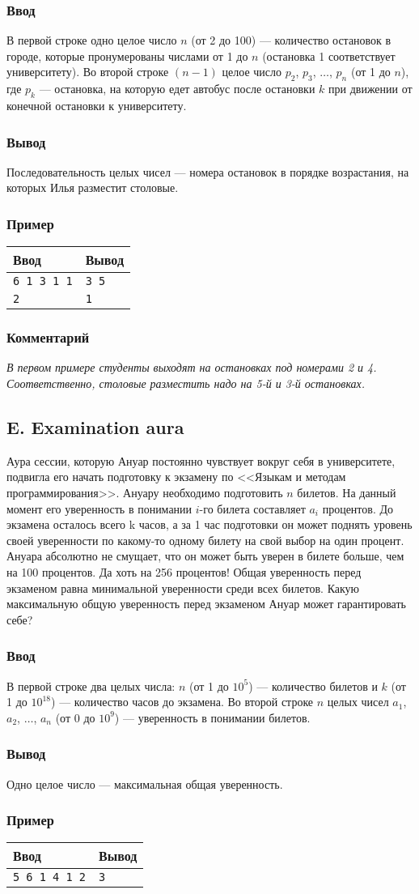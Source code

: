 \documentclass[10pt, a4paper]{article}
\newcommand{\informat}[1]
{
	\subsubsection*{Ввод} #1
}
\newcommand{\outformat}[1]
{
	\subsubsection*{Вывод} #1
}
\newcommand{\example}[2]
{
	\subsubsection*{Пример}
	\noindent
	\begin{center}
	\begin{tabularx}{\linewidth}{|X|X|}
	\hline
	Ввод & Вывод \\
	\hline
	{\tt #1} & {\tt #2}		\\
	\hline
	\end{tabularx}
	\end{center}
}
\newcommand{\examplee}[4]
{
	\subsubsection*{Пример}
	\noindent
	\begin{center}
	\begin{tabularx}{\linewidth}{|X|X|}
	\hline
	Ввод 	& Вывод  	\\
	\hline
	{\tt #1} & {\tt #2}	\\
	\hline
	{\tt #3} & {\tt #4}	\\
	\hline
	\end{tabularx}
	\end{center}
}
\newcommand{\excomm}[1]
{
	\subsubsection*{Комментарий}
	\textit{#1}
}
\begin{document}
\informat{В первой строке одно целое число $n$ (от 2 до 100) --- количество остановок в городе, которые пронумерованы числами от 1 до $n$ (остановка 1 соответствует университету). Во второй строке $(n-1)$ целое число $p_2$, $p_3$, $\dots$, $p_n$ (от 1 до $n$), где $p_k$ --- остановка, на которую едет автобус после остановки $k$ при движении от конечной остановки к университету.}
 
\outformat{Последовательность целых чисел --- номера остановок в порядке возрастания, на которых Илья разместит столовые.}

\examplee{6 \newline 5 1 3 1 1}{3 5}{2 \newline 1}{1}

\excomm{В первом примере студенты выходят на остановках под номерами 2 и 4. Соответственно, столовые разместить надо на 5-й и 3-й остановках.}



\subsection*{E. Examination aura}

Аура сессии, которую Ануар постоянно чувствует вокруг себя в университете, подвигла его начать подготовку к экзамену по <<Языкам и методам программирования>>. Ануару необходимо подготовить $n$ билетов. На данный момент его уверенность в понимании $i$-го билета составляет $a_i$ процентов. До экзамена осталось всего k часов, а за 1 час подготовки он может поднять уровень своей уверенности по какому-то одному билету на свой выбор на один процент. Ануара абсолютно не смущает, что он может быть уверен в билете больше, чем на 100 процентов. Да хоть на 256 процентов! Общая уверенность перед экзаменом равна минимальной уверенности среди всех билетов. Какую максимальную общую уверенность перед экзаменом Ануар может гарантировать себе? 
 
\informat{В первой строке два целых числа: $n$ (от 1 до $10^5$) --- количество билетов и $k$ (от 1 до $10^{18}$) --- количество часов до экзамена. \newline
Во второй строке $n$ целых чисел $a_1$, $a_2$, $\dots$, $a_n$ (от 0 до $10^9$) --- уверенность в понимании билетов.}

\outformat{Одно целое число --- максимальная общая уверенность.}
 
\example{5 6 \newline 5 1 4 1 2}{3}
 
\end{document}
